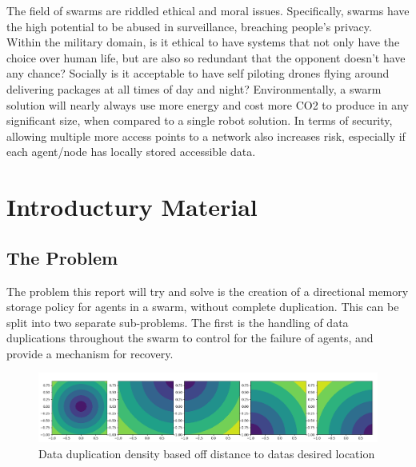 \documentclass{UoYCSproject}
\begin{document}
\begin{summary}

The field of swarms are riddled ethical and moral issues. Specifically, swarms have the high potential to be abused in surveillance, breaching people's privacy. Within the military domain, is it ethical to have systems that not only have the choice over human life, but are also so redundant that the opponent doesn’t have any chance? Socially is it acceptable to have self piloting drones flying around delivering packages at all times of day and night? Environmentally, a swarm solution will nearly always use more energy and cost more CO2 to produce in any significant size, when compared to a single robot solution. In terms of security, allowing multiple more access points to a network also increases risk, especially if each agent/node has locally stored accessible data. 

\end{summary}



\chapter{Introductury Material}
\label{cha:Introductury Material}

\section{The Problem}
\label{sec:Problem}

The problem this report will try and solve is the creation of a directional memory storage policy for agents in a swarm, without complete duplication. 
This can be split into two separate sub-problems.
The first is the handling of data duplications throughout the swarm to control for the failure of agents, and provide a mechanism for recovery.

\begin{figure}[htb]
\label{fig:popdensity}
\begin{center}
\centering
\includegraphics[width=\linewidth]{"./ExplanationImgs/Memory_Pop_Density.png"}
\caption{Data duplication density based off distance to datas desired location}
\end{center}
\end{figure}
\end{document}
